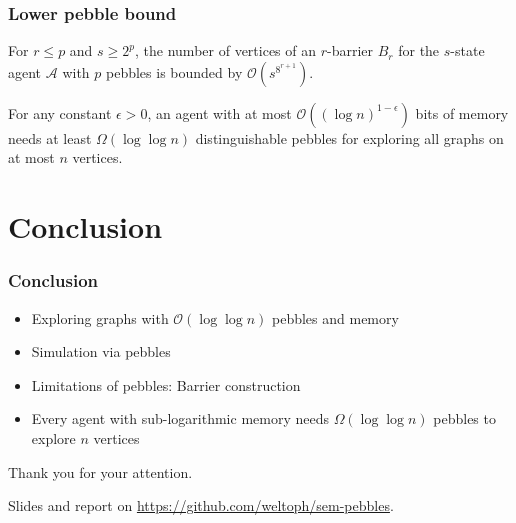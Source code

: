 \documentclass{beamer}
\begin{document}
\begin{frame}
  \frametitle{Lower pebble bound}
  \begin{mdframed}
    \begin{theorem}
      For $r\leq p$ and $s\geq 2^{p}$, the number of vertices of an $r$-barrier
      $B_{r}$ for the $s$-state agent $\mathcal{A}$ with $p$ pebbles is bounded
      by $\mathcal{O}(s^{8^{r+1}})$.
    \end{theorem}
  \end{mdframed}
  \begin{center}
  \end{center}
  \begin{mdframed}
    \begin{theorem}
      For any constant $\epsilon > 0$, an agent with at most
      $\mathcal{O}((\log n)^{1-\epsilon})$ bits of memory needs at least
      $\Omega(\log\log n)$ distinguishable pebbles for exploring all
      graphs on at most $n$ vertices.
    \end{theorem}
  \end{mdframed}
\end{frame}

\section{Conclusion}
\begin{frame}
  \frametitle{Conclusion}
  \begin{itemize}
    \item Exploring graphs with $\mathcal{O}(\log\log n)$ pebbles and memory
    \item Simulation via pebbles
    \item Limitations of pebbles: Barrier construction
    \item Every agent with sub-logarithmic memory needs $\Omega(\log\log n)$
      pebbles to explore $n$ vertices
  \end{itemize}
\end{frame}

\begin{frame}
  \vspace{0.3\textheight}
  \begin{center}
    {\Huge Thank you for your attention.}
  \end{center}
  \vspace{0.35\textheight}
  Slides and report on \url{https://github.com/weltoph/sem-pebbles}.
\end{frame}
\end{document}
